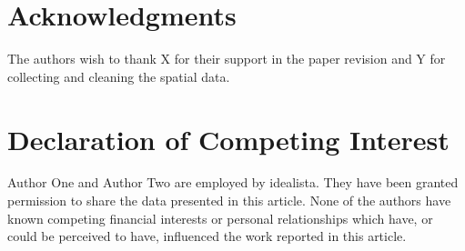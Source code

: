 \documentclass[times,final]{elsarticle}
\begin{document}
\section*{Acknowledgments}

The authors wish to thank X for their support in the paper revision and Y for collecting and cleaning the spatial data.


\section*{Declaration of Competing Interest}

Author One and Author Two are employed by idealista. They have been granted permission to share the data presented in this article. None of the authors have known competing financial interests or personal relationships which have, or could be perceived to have, influenced the work reported in this article.
\end{document}
